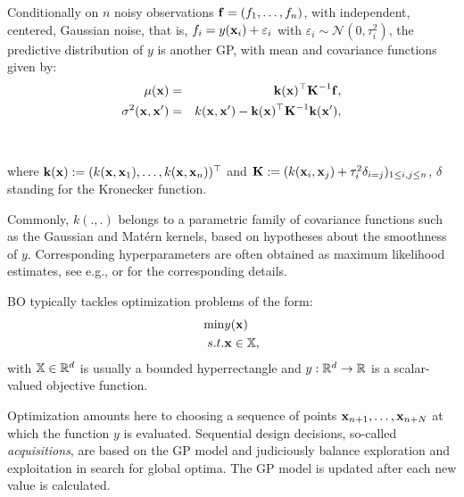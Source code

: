 Conditionally on $n$ noisy observations $\mathbf{f} = (f_1, \ldots, f_n)$, with independent, centered, Gaussian noise,
that is, $f_i = y(\mathbf{x}_i) + \varepsilon_i$ with $\varepsilon_i \sim \mathcal{N}(0, \tau_i^2)$,
the predictive distribution of $y$ is another GP, with mean and covariance functions given by:
\begin{eqnarray}
\mu(\mathbf{x}) & =& \textbf{k}(\mathbf{x})^\top \textbf{K}^{-1} \mathbf{f},  \\
\sigma^2(\mathbf{x}, \mathbf{x}') & =& k(\mathbf{x}, \mathbf{x}') - \textbf{k}(\mathbf{x})^\top \textbf{K}^{-1} \textbf{k}(\mathbf{x}'),
\end{eqnarray}
\\
\\
where $\textbf{k}(\mathbf{x}) := (k(\mathbf{x}, \mathbf{x}_1), \dots, k(\mathbf{x}, \mathbf{x}_n))^\top$ and $\textbf{K} := (k(\mathbf{x}_i, \mathbf{x}_j) + \tau_i^2 \delta_{i=j})_{1 \leq i,j \leq n}$,
$\delta$ standing for the Kronecker function.

Commonly, $k(.,.)$ belongs to a parametric family of covariance functions such as the Gaussian and Mat\'ern kernels, 
based on hypotheses about the smoothness of $y$. Corresponding hyperparameters are often obtained as maximum likelihood estimates, 
see e.g., \citet{Rasmussen2006} or \citet{Roustant2012} for the corresponding details.   

BO typically tackles optimization problems of the form:
\begin{eqnarray*}
 \min & y(\mathbf{x}) \\
 s.t. & \mathbf{x} \in \mathbb{X},
\end{eqnarray*}
with $\mathbb{X} \in \mathbb{R}^d$ is usually a bounded hyperrectangle and $y:\mathbb{R}^d \rightarrow \mathbb{R}$ is a scalar-valued objective function.

Optimization amounts here to choosing a sequence of points $\mathbf{x}_{n+1}, \ldots, \mathbf{x}_{n+N}$ at which the function $y$ is evaluated.
Sequential design decisions, so-called {\em acquisitions}, are based on the GP model and judiciously balance exploration and exploitation 
in search for global optima. The GP model is updated after each new value is calculated.

